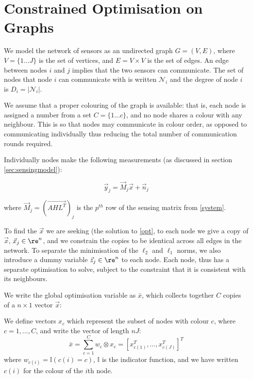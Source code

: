 \section{Constrained Optimisation on Graphs}\label{sec:opt-on-graphs}

We model the network of sensors as an undirected graph \(G = \left(V,E\right)\), where \(V = \{1 \ldots J\}\) is the set of vertices, and \(E = V \times V\) is the set of edges. An edge between nodes \(i\) and \(j\) implies that the two sensors can communicate. The set of nodes that node \(i\) can communicate with is written \(\mathcal{N}_i\) and the degree of node \(i\) is \(D_i = |\mathcal{N}_i|\). 

We assume that a proper colouring of the graph is available: that is, each node is assigned a number from a set \(C = \{1 \ldots c \} \), and no node shares a colour with any neighbour. This is so that nodes may communicate in colour order, as opposed to communicating individually thus reducing the total number of communication rounds required. 

Individually nodes make the following measurements (as discussed in section \ref{sec:sensingmodel}):

\begin{equation}
\vec{y}_j = \vec{M}_j\vec{x} + \vec{n}_j
\end{equation}

where \(\vec{M}_j = \left(\vec{AHL^T}\right)_j \) is the \(p^{th} \) row of the sensing matrix from \eqref{system}.

To find the \(\vec{x}\) we are seeking (the solution to \eqref{opt}, to each node we give a copy of \(\vec{x}\), \(\vec{x}_j \in \re^n\), and we constrain the copies to be identical across all edges in the network. To separate the minimisation of the \(\ell_2\) and \(\ell_1\) norms, we also introduce a dummy variable \(\vec{z}_j \in \re^n\) to each node. Each node, thus has a separate optimisation to solve, subject to the constraint that it is consistent with its neighbours.

We write the global optimisation variable as \(\bar{x}\), which collects together \(C\) copies of a \(n\times 1\) vector \(\vec{x}\):

\begin{defn}
We define vectors \(x_c\) which represent the subset of nodes with colour \(c\), where \(c = 1,\ldots , C\), and write the vector of length \(nJ\):
\begin{equation}
\bar{x} = \sum_{c=1}^C w_c \otimes x_c = \left[x_{c(1)}^T, \ldots	, x_{c(J)}^T\right]^T
\label{barxc}
\end{equation}
where \(w_{c(i)} = \mathbb{I}(c(i) = c)\), \(\mathbb{I}\) is the indicator function, and we have written \(c(i)\) for the colour of the \(i\)th node.
\end{defn}


